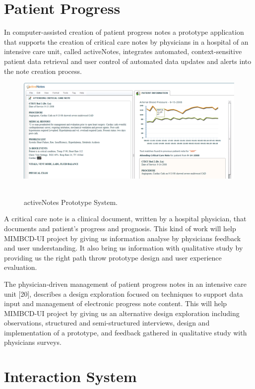 \section{Patient Progress}

In computer-assisted creation of patient progress notes \cite{wilcox2009activenotes} a prototype application that supports the creation of critical care notes by physicians in a hospital of an intensive care unit, called activeNotes, integrates automated, context-sensitive patient data retrieval and user control of automated data updates and alerts into the note creation process.

\begin{figure}[!hbt]
\centering
\includegraphics[width=15cm]{images/activenotes}~\\
\caption{\label{fig:activenotes}activeNotes Prototype System.
}
\end{figure}

A critical care note is a clinical document, written by a hospital physician, that documents and patient's progress and prognosis. This kind of work will help MIMBCD-UI project by giving us information analyse by physicians feedback and user understanding. It also bring us information with qualitative study by providing us the right path throw prototype design and user experience evaluation.

The physician-driven management of patient progress notes in an intensive care unit [20], describes a design exploration focused on techniques to support data input and management of electronic progress note content. This will help MIMBCD-UI project by giving us an alternative design exploration including observations, structured and semi-structured interviews, design and implementation of a prototype, and feedback gathered in qualitative study with physicians surveys.

\section{Interaction System}

